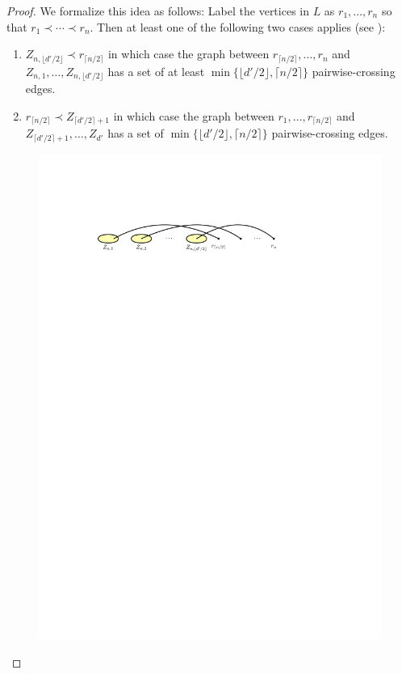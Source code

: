 \documentclass[kpfonts]{patmorin}
\begin{document}
\begin{proof}
   We formalize this idea as follows: Label the vertices in $L$ as $r_1,\ldots,r_n$ so that $r_1\prec \cdots\prec r_{n}$.  Then at least one of the following two cases applies (see ):
    \begin{enumerate}
        \item $Z_{n,\lfloor d'/2\rfloor}\prec r_{\lceil n/2\rceil}$ in which case the graph between $r_{\lceil n/2\rceil},\ldots,r_{n}$ and $Z_{n,1},\ldots,Z_{n,\lfloor d'/2\rfloor}$ has a set of at least $\min\{\lfloor d'/2\rfloor,\lceil n/2\rceil\}$ pairwise-crossing edges.
        \item $r_{\lceil n/2\rceil}\prec Z_{\lceil d'/2\rceil+1}$ in which case the graph between $r_1,\ldots,r_{\lceil n/2\rceil}$ and $Z_{\lceil d'/2\rceil+1},\ldots,Z_{d'}$ has a set of $\min\{\lfloor d'/2\rfloor,\lceil n/2\rceil\}$ pairwise-crossing edges.
    \end{enumerate}
	\begin{figure}[!h]
		\centering
			\includegraphics{figs/median-1} \\[2em]

\end{figure}
\end{proof}
\end{document}
